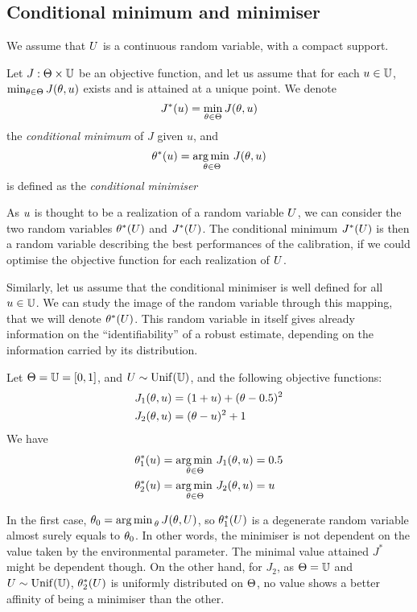 \documentclass[../../Main_ManuscritThese.tex]{subfiles}
\begin{document}
\subsection{Conditional minimum and minimiser}
\label{sec:MPE}
We assume that $U$ is a continuous random variable, with a compact
support.
\begin{definition}
  Let $J: \Theta \times \mathbb{U}$ be an objective function, and let us
  assume that for each $u \in \mathbb{U}$,
  $\min_{\theta \in \Theta} J(\theta,u)$ exists and is attained at a
  unique point.  We denote
  \begin{equation}
    J^*(u) = \min_{\theta \in \Theta} J(\theta,u)
  \end{equation}
  the \emph{conditional minimum} of $J$ given $u$, and
  \begin{equation}
    \label{eq:def_kstar}
    \theta^*(u) = \operatorname*{arg\,min \,}_{\theta\in\Theta} J(\theta, u)
  \end{equation}
 is defined as the \emph{conditional minimiser}
\end{definition}
As $u$ is thought to be a realization of a random variable $U$, we
can consider the two random variables $\theta^*(U)$ and $J^*(U)$.
The conditional minimum $J^*(U)$ is then a random variable
describing the best performances of the calibration, if we could
optimise the objective function for each realization of $U$.

Similarly, let us assume that the conditional minimiser is well
defined for all $u\in \mathbb{U}$. We can study the image of the random
variable through this mapping, that we will denote $\theta^*(U)$.  This
random variable in itself gives already information on the
``identifiability'' of a robust estimate, depending on the information
carried by its distribution.
\begin{example}
Let $\Theta = \mathbb{U}= [0, 1]$, and $U \sim \mathrm{Unif}(\mathbb{U})$, and the following objective functions:
\begin{align}
  J_1(\theta, u) &= (1+u)+(\theta - 0.5)^2\\
  J_2(\theta, u) &= (\theta-u)^2 + 1
\end{align}
We have
\begin{align}
  \theta^*_1(u) &= \operatorname*{arg\,min \,}_{\theta \in \Theta} J_1(\theta, u) = 0.5 \\
  \theta^*_2(u) &= \operatorname*{arg\,min \,}_{\theta\in\Theta} J_2(\theta, u) = u
\end{align}

In the first case, $\theta_0 = \operatorname*{arg\,min \,}_{\theta} J(\theta, U)$, so
$\theta_1^*(U)$ is a degenerate random variable almost surely equals to
$\theta_0$. In other words, the minimiser is not dependent on the value
taken by the environmental parameter. The minimal value attained $J^*$
might be dependent though. On the other hand, for $J_2$, as
$\Theta=\mathbb{U}$ and $U \sim \mathrm{Unif}(\mathbb{U})$,
$\theta_2^*(U)$ is uniformly distributed on $\Theta$, no value shows a
better affinity of being a minimiser than the other.
\end{example}
\end{document}
